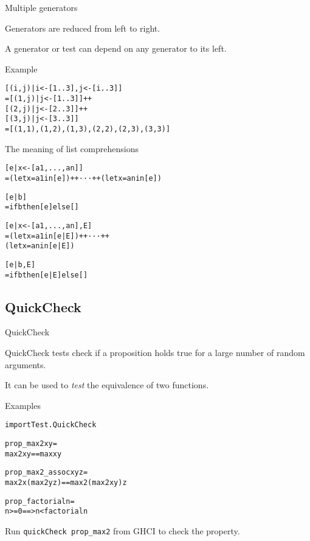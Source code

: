 \documentclass{beamer}
\def\code#1{\texttt{\frenchspacing#1}}
\begin{document}
\begin{frame}[fragile]{Multiple generators}

Generators are reduced from left to right. \par
A generator or test can depend on any generator to its left.

\pause

\begin{exampleblock}{Example}
\begin{alltt}
[(i,j) | i <- [1 .. 3], j <- [i .. 3]]\pause
= [(1,j) | j <- [1..3]] ++
  [(2,j) | j <- [2..3]] ++
  [(3,j) | j <- [3..3]]\pause
= [(1,1), (1,2), (1,3), (2,2), (2,3), (3,3)]
\end{alltt}
\end{exampleblock}

\end{frame}

\begin{frame}[fragile]{The meaning of list comprehensions}

\begin{alltt}
[e | x <- [a1,...,an]]\pause
= (let x = a1 in [e]) ++ · · · ++ (let x = an in [e])

[e | b]\pause
= if b then [e] else []

[e | x <- [a1,...,an], E]\pause
= (let x = a1 in [e | E]) ++ · · · ++
  (let x = an in [e | E])

[e | b, E]\pause
= if b then [e | E] else []
\end{alltt}

\end{frame}

\subsection{QuickCheck}

\begin{frame}[fragile]{QuickCheck}

QuickCheck tests check if a proposition holds true for a large number of random arguments. \par\pause
It can be used to \textit{test} the equivalence of two functions.

\pause

\begin{exampleblock}{Examples}
\begin{alltt}
import Test.QuickCheck

prop_max2 x y =\pause
  max2 x y == max x y

prop_max2_assoc x y z =\pause
  max2 x (max2 y z) == max2 (max2 x y) z

prop_factorial n =\pause
  n >= 0 ==> n < factorial n
\end{alltt}
\end{exampleblock}

\pause

Run \code{quickCheck prop\_max2} from GHCI to check the property.

\end{frame}
\end{document}
